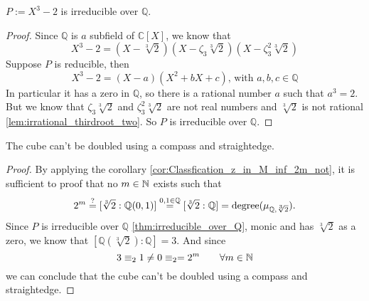 \begin{lemma}
    $P := X^3 - 2$ is irreducible over $\mathbb{Q}$.
\label{thm:irreducible_over_Q}
\end{lemma}
\begin{proof}
    Since $\mathbb{Q}$ is $a$ subfield of $\mathbb{C} [X]$, we know that
    \begin{equation*}
        X^3 - 2 = (X - \sqrt[3]{2})(X -\zeta_3 \sqrt[3]{2})(X -\zeta_3^2 \sqrt[3]{2})
    \end{equation*}
    Suppose $P$ is reducible, then
    \begin{equation*}
        X^3 - 2 = (X - a)(X^2 + bX + c)\text{, with } a, b, c \in \mathbb{Q}
    \end{equation*}
    In particular it has a zero in $\mathbb{Q}$, so there is a rational number $a$ such that $a^3 = 2$.\newline
    But we know that $\zeta_3 \sqrt[3]{2}$ and $\zeta_3^2 \sqrt[3]{2}$ are not real numbers and $\sqrt[3]{2}$ is not rational \ref{lem:irrational_thirdroot_two}.
    So $P$ is irreducible over $\mathbb{Q}$.
\end{proof}

\begin{theorem}
    The cube can't be doubled using a compass and straightedge.
\end{theorem}
\begin{proof}
    By applying the corollary \ref{cor:Classfication_z_in_M_inf_2m_not}, it is sufficient to proof that no $m\in \mathbb{N}$ exists such that
    $$2^m\overset{?}{=}[\sqrt[3]{2}:\mathbb{Q}({0,1})]\overset{0,1\in\mathbb{Q}}{=} [\sqrt[3]{2}:\mathbb{Q}] = \text{degree}(\mu_{\mathbb{Q},\sqrt[3]{2}}).$$
    Since $P$ is irreducible over $\mathbb{Q}$ \ref{thm:irreducible_over_Q}, monic and has $\sqrt[3]{2}$ as a zero, we know that $[\mathbb{Q}(\sqrt[3]{2}):\mathbb{Q}] = 3$.
    And since $$ 3  \equiv_2 1 \neq 0  \equiv_2 = 2^m \qquad\forall m \in \mathbb{N}$$
    we can conclude that the cube can't be doubled using a compass and straightedge.
    
\end{proof}

